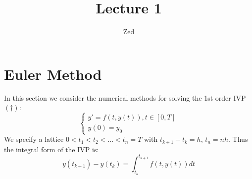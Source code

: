 \documentclass[a4paper, 11pt]{article}
\title{\textbf{Lecture 1}{}}
\author{Zed}{}
\begin{document}
\maketitle

\section{Euler Method}
In this section we consider the numerical methods for solving the 1st order IVP $(\dag)$:
$$
\begin{cases}
    y'=f(t,y(t)), t\in[0,T] \\
    y(0)=y_0
\end{cases}
$$
We specify a lattice $0 < t_1 < t_2 < ... < t_n = T$ with $t_{k+1}-t_k = h$, $t_n=nh$. Thus the integral form of the IVP is:
$$
y(t_{k+1})-y(t_{k}) = \int_{t_k}^{t_{k+1}} f(t, y(t))dt
$$
\end{document}
